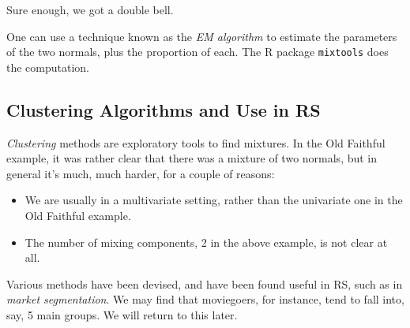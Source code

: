 Sure enough, we got a double bell.

One can use a technique known as the \textit{EM algorithm} to estimate
the parameters of the two normals, plus the proportion of each.  The R
package \lstinline{mixtools} does the computation.

\subsection{Clustering Algorithms and Use in RS}

\textit{Clustering} methods are exploratory tools to find mixtures.  In
the Old Faithful example, it was rather clear that there was a mixture
of two normals, but in general it's much, much harder, for a couple of
reasons:

\begin{itemize}

\item We are usually in a multivariate setting, rather than the
univariate one in the Old Faithful example.

\item The number of mixing components, 2 in the above example, is not
clear at all.

\end{itemize} 

Various methods have been devised, and have been found useful in RS,
such as in \textit{market segmentation}.  We may find that moviegoers,
for instance, tend to fall into, say, 5 main groups.  We will return to
this later.
